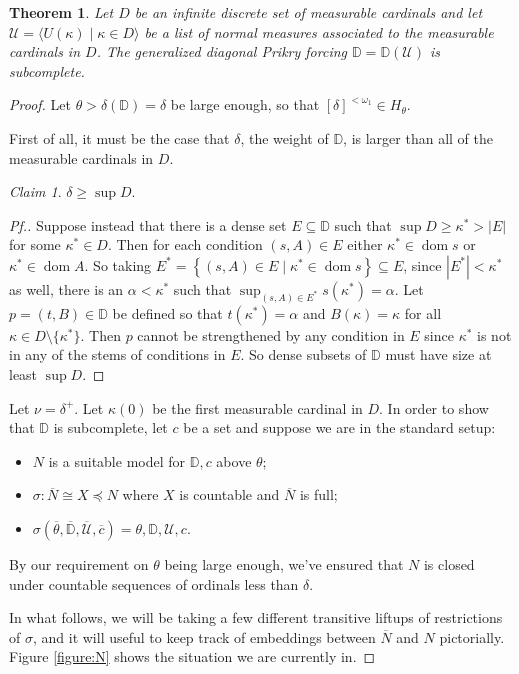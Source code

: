 \documentclass{amsart}
\newtheorem{theorem}{Theorem}[section]
\theoremstyle{definition}
\theoremstyle{remark}
\newtheorem{claimno}{Claim}
\newcommand{\D}{\mathbb{D}}
\newcommand{\N}{{\overline{N}}}
\newcommand{\U}{\mathcal{U}}
\DeclareMathOperator{\dom}{dom}
\newcommand{\st}{\; | \;}
\newcommand{\set}[2]{\left\{#1\st #2 \right\}}
\newcommand{\seq}[2]{\langle #1 \st #2 \rangle}
\begin{document}
\begin{theorem} \label{theorem:main} Let $D$ be an infinite discrete set of measurable cardinals and let $\U = \seq{ U(\kappa) }{\kappa \in D }$ be a list of normal measures associated to the
measurable cardinals in $D$. 
The generalized diagonal Prikry forcing $\D=\D(\U)$ is subcomplete. \end{theorem}
\begin{proof} 
Let $\theta > \delta(\D) =\delta$ be large enough, so that $[\delta]^{<\omega_1} \in H_\theta$. 

First of all, it must be the case that $\delta$, the weight of $\D$, is larger than all of the measurable cardinals in $D$.
\begin{claimno} $\delta \geq \sup D$. \end{claimno}
\begin{proof}[Pf.] Suppose instead that there is a dense set $E \subseteq \D$ such that $\sup D \geq \kappa^* >|E|$ for some $\kappa^* \in D$. Then for each condition $(s,A) \in E$ either $\kappa^* \in \dom s$ or $\kappa^* \in \dom A$. So taking $E^*=\set{ (s, A) \in E }{ \kappa^* \in \dom s } \subseteq E$, since $|E^*| < \kappa^*$ as well, there is an $\alpha<\kappa^*$ such that $\sup_{(s,A) \in E^*} s(\kappa^*)=\alpha$. Let $p=(t, B) \in \D$ be defined so that $t(\kappa^*)=\alpha$ and $B(\kappa)=\kappa$ for all $\kappa \in D \setminus \{ \kappa^*\}$. Then $p$ cannot be strengthened by any condition in $E$ since $\kappa^*$ is not in any of the stems of conditions in $E$. So dense subsets of $\D$ must have size at least $\sup D$.\end{proof}

Let $\nu = \delta^+$. Let $\kappa(0)$ be the first measurable cardinal in $D$. 
In order to show that $\D$ is subcomplete, let $c$ be a set and suppose we are in the standard setup: \begin{itemize}
	\item $N$ is a suitable model for $\D, c$ above $\theta$;
	\item $\sigma: \N \cong X \preccurlyeq N$ where $X$ is countable and $\N$ is full;
	\item $\sigma(\overline \theta, \overline{\D}, \overline{\U}, \overline c)=\theta, \D, \U, c$.
\end{itemize}
By our requirement on $\theta$ being large enough, we've ensured that $N$ is closed under countable sequences of ordinals less than $\delta$.

In what follows, we will be taking a few different transitive liftups of restrictions of $\sigma$, and it will useful to keep track of embeddings between $\N$ and $N$ pictorially. Figure \ref{figure:N} shows the situation we are currently in.


\end{proof}
\end{document}
